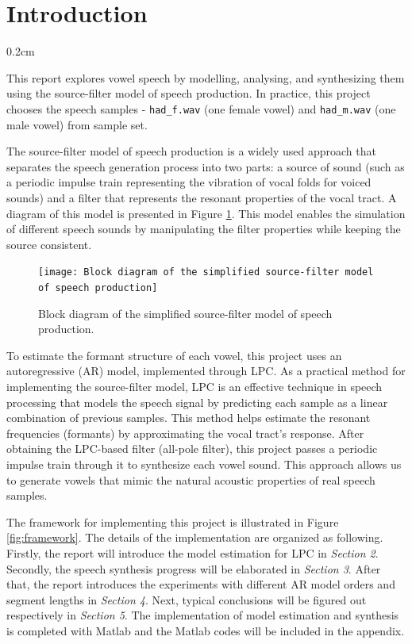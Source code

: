 \documentclass{article}
\newcommand{\setParDis}{\setlength {\parskip} {0.2cm} } %
\begin{document}

\section{Introduction}
\setParDis

This report explores vowel speech by modelling, analysing, and synthesizing them using the source-filter model of speech production. In practice, this project chooses the speech samples - \verb+had_f.wav+ (one female vowel) and \verb+had_m.wav+ (one male vowel) from sample set. 

The source-filter model of speech production is a widely used approach that separates the speech generation process into two parts: a source of sound (such as a periodic impulse train representing the vibration of vocal folds for voiced sounds) and a filter that represents the resonant properties of the vocal tract\citep{kondoz2005digital}. A diagram of this model is presented in Figure \ref{fig:source-filter}. This model enables the simulation of different speech sounds by manipulating the filter properties while keeping the source consistent.

\begin{figure}[ht]
\begin{center}
\texttt{[image: Block diagram of the simplified source-filter model of speech production]}
\end{center}
\caption{\label{fig:source-filter} Block diagram of the simplified source-filter model of speech production\citep{kondoz2005digital}.}
\end{figure}

To estimate the formant structure of each vowel, this project uses an autoregressive (AR) model, implemented through LPC. As a practical method for implementing the source-filter model, LPC is an effective technique in speech processing that models the speech signal by predicting each sample as a linear combination of previous samples\citep{kondoz2005digital}. This method helps estimate the resonant frequencies (formants) by approximating the vocal tract’s response. After obtaining the LPC-based filter (all-pole filter), this project passes a periodic impulse train through it to synthesize each vowel sound. This approach allows us to generate vowels that mimic the natural acoustic properties of real speech samples.

The framework for implementing this project is illustrated in Figure \ref{fig:framework}. The details of the implementation are organized as following. Firstly, the report will introduce the model estimation for LPC in \textit{Section 2}. Secondly, the speech synthesis progress will be elaborated in \textit{Section 3}. After that, the report introduces the experiments with different AR model orders and segment lengths in \textit{Section 4}. Next, typical conclusions will be figured out respectively in \textit{Section 5}. The implementation of model estimation and synthesis is completed with Matlab and the Matlab codes will be included in the appendix.
\end{document}
